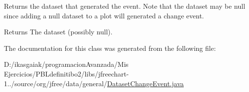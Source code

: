 Returns the dataset that generated the event. Note that the dataset may be {\ttfamily null} since adding a {\ttfamily null} dataset to a plot will generated a change event.

\begin{DoxyReturn}{Returns}
The dataset (possibly {\ttfamily null}). 
\end{DoxyReturn}


The documentation for this class was generated from the following file\+:\begin{DoxyCompactItemize}
\item 
D\+:/ikasgaiak/programacion\+Avanzada/\+Mis Ejercicios/\+P\+B\+Ldefinitibo2/libs/jfreechart-\/1../source/org/jfree/data/general/\mbox{\hyperlink{_dataset_change_event_8java}{Dataset\+Change\+Event.\+java}}\end{DoxyCompactItemize}
